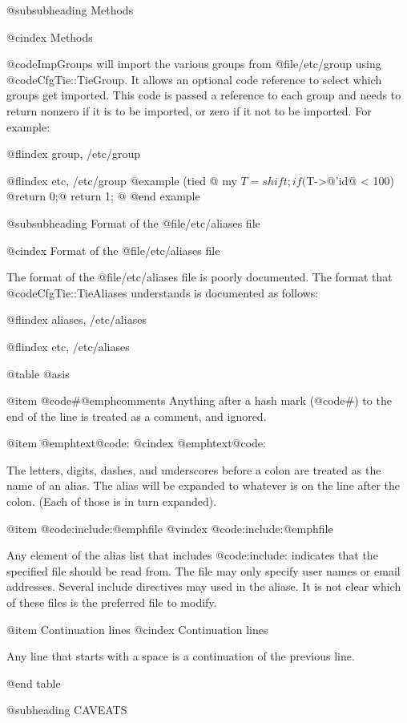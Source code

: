 @subsubheading Methods

@cindex Methods

@code{ImpGroups} will import the various groups from @file{/etc/group} using
@code{CfgTie::TieGroup}.  It allows an optional code reference to select which
groups get imported.  This code is passed a reference to each group and needs
to return nonzero if it is to be imported, or zero if it not to be imported.
For example:

@flindex group, /etc/group

@flindex etc, /etc/group
@example
   (tied  %
        @{
           my $T=shift;
           if ($T->@{'id@} < 100) @{return 0;@}
           return 1;
        @}
@end example

@subsubheading Format of the @file{/etc/aliases} file

@cindex Format of the @file{/etc/aliases} file

The format of the @file{/etc/aliases} file is poorly documented.  The format that
@code{CfgTie::TieAliases} understands is documented as follows:

@flindex aliases, /etc/aliases

@flindex etc, /etc/aliases

@table @asis

@item @code{#}@emph{comments}
Anything after a hash mark (@code{#}) to the end of the line is treated as a
comment, and ignored.

@item @emph{text}@code{:}
@cindex @emph{text}@code{:}

The letters, digits, dashes, and underscores before a colon are treated as
the name of an alias.  The alias will be expanded to whatever is on the
line after the colon.  (Each of those is in turn expanded).

@item @code{:include:}@emph{file}
@vindex @code{:include:}@emph{file}

Any element of the alias list that includes @code{:include:} indicates that the
specified file should be read from.  The file may only specify user names or
email addresses.  Several include directives may used in the aliase.  It is not
clear which of these files is the preferred file to modify.

@item Continuation lines
@cindex Continuation lines

Any line that starts with a space is a continuation of the previous line.

@end table

@subheading CAVEATS

